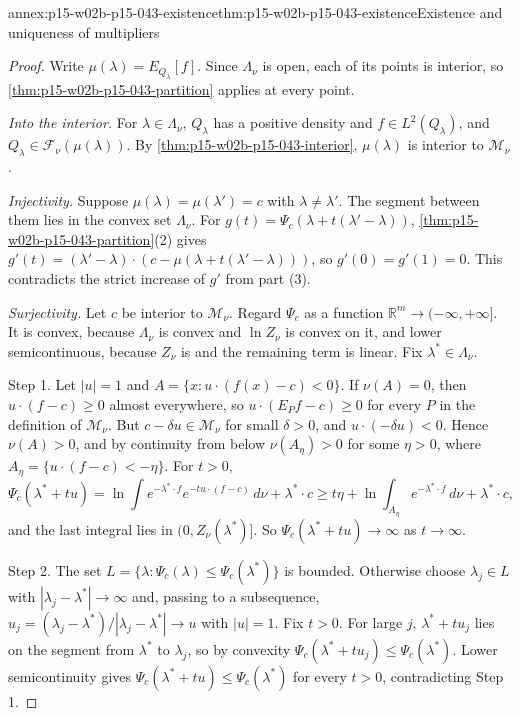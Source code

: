 \begin{annexitem}{annex:p15-w02b-p15-043-existence}{thm:p15-w02b-p15-043-existence}{Existence and uniqueness of multipliers}
\begin{proof}
Write \(\mu(\lambda)=E_{Q_\lambda}[f]\). Since \(\Lambda_\nu\) is open, each of
its points is interior, so \cref{thm:p15-w02b-p15-043-partition} applies at
every point.

\emph{Into the interior.} For \(\lambda\in\Lambda_\nu\), \(Q_\lambda\) has a
positive density and \(f\in L^2(Q_\lambda)\), and
\(Q_\lambda\in\mathcal F_\nu(\mu(\lambda))\). By
\cref{thm:p15-w02b-p15-043-interior}, \(\mu(\lambda)\) is interior to
\(\mathcal M_\nu\).

\emph{Injectivity.} Suppose \(\mu(\lambda)=\mu(\lambda')=c\) with
\(\lambda\neq\lambda'\). The segment between them lies in the convex set
\(\Lambda_\nu\). For \(g(t)=\Psi_c(\lambda+t(\lambda'-\lambda))\),
\cref{thm:p15-w02b-p15-043-partition}(2) gives
\(g'(t)=(\lambda'-\lambda)\cdot(c-\mu(\lambda+t(\lambda'-\lambda)))\), so
\(g'(0)=g'(1)=0\). This contradicts the strict increase of \(g'\) from part (3).

\emph{Surjectivity.} Let \(c\) be interior to \(\mathcal M_\nu\). Regard
\(\Psi_c\) as a function \(\mathbb R^m\to(-\infty,+\infty]\). It is convex,
because \(\Lambda_\nu\) is convex and \(\ln Z_\nu\) is convex on it, and lower
semicontinuous, because \(Z_\nu\) is and the remaining term is linear. Fix
\(\lambda^*\in\Lambda_\nu\).

Step 1. Let \(|u|=1\) and \(A=\{x:u\cdot(f(x)-c)<0\}\). If \(\nu(A)=0\), then
\(u\cdot(f-c)\geq0\) almost everywhere, so \(u\cdot(E_Pf-c)\geq0\) for every
\(P\) in the definition of \(\mathcal M_\nu\). But \(c-\delta u\in\mathcal M_\nu\)
for small \(\delta>0\), and \(u\cdot(-\delta u)<0\). Hence \(\nu(A)>0\), and by
continuity from below \(\nu(A_\eta)>0\) for some \(\eta>0\), where
\(A_\eta=\{u\cdot(f-c)<-\eta\}\). For \(t>0\),
\[
 \Psi_c(\lambda^*+tu)=\ln\int e^{-\lambda^*\cdot f}e^{-tu\cdot(f-c)}\,d\nu+\lambda^*\cdot c
 \geq t\eta+\ln\int_{A_\eta}e^{-\lambda^*\cdot f}\,d\nu+\lambda^*\cdot c ,
\]
and the last integral lies in \((0,Z_\nu(\lambda^*)]\). So
\(\Psi_c(\lambda^*+tu)\to\infty\) as \(t\to\infty\).

Step 2. The set \(L=\{\lambda:\Psi_c(\lambda)\leq\Psi_c(\lambda^*)\}\) is bounded.
Otherwise choose \(\lambda_j\in L\) with \(|\lambda_j-\lambda^*|\to\infty\) and,
passing to a subsequence, \(u_j=(\lambda_j-\lambda^*)/|\lambda_j-\lambda^*|\to u\)
with \(|u|=1\). Fix \(t>0\). For large \(j\), \(\lambda^*+tu_j\) lies on the
segment from \(\lambda^*\) to \(\lambda_j\), so by convexity
\(\Psi_c(\lambda^*+tu_j)\leq\Psi_c(\lambda^*)\). Lower semicontinuity gives
\(\Psi_c(\lambda^*+tu)\leq\Psi_c(\lambda^*)\) for every \(t>0\), contradicting
Step 1.


\end{proof}
\end{annexitem}

